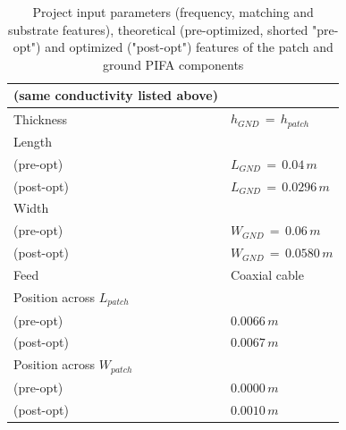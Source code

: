 \documentclass[10 pt,a4paper,twocolumn]{article}
\begin{document}
{\begin{table}[t!]
\begin{center}
{\begin{tabular}{|m{4.2cm}|m{4.2cm}|}
			(same conductivity listed above) \\
			\hline
			Thickness & $h_{GND}\,=\,h_{patch}$
			\\
			\hline
			Length & \\ 
			(pre-opt) & $L_{GND}\,=\,0.04\,m$\\
			(post-opt) & $L_{GND}\,=\,0.0296\,m$\\
			\hline 
		Width &  	\\
		(pre-opt) & $W_{GND}\,=\,0.06\,m$\\
		(post-opt) & $W_{GND}\,=\,0.0580\,m$ \\
			\hline
			\cellcolor{flax}Feed & \cellcolor{flax} Coaxial cable \\
			\hline
			Position across $L_{patch}$ &\\
			(pre-opt) & $0.0066\,m$ \\
			(post-opt) & $0.0067\,m$ \\
			\hline
			Position across $W_{patch}$ & \\
			(pre-opt) & $0.0000\,m$\\
			(post-opt) & $0.0010\,m$\\
			\hline
	\end{tabular}}
	\caption{Project input parameters (frequency, matching and substrate features), theoretical (pre-optimized, shorted "pre-opt") and optimized ("post-opt") features of the patch and ground PIFA components}
	\label{table:pifa design parameters}
\end{center}

\end{table}

}
\end{document}
